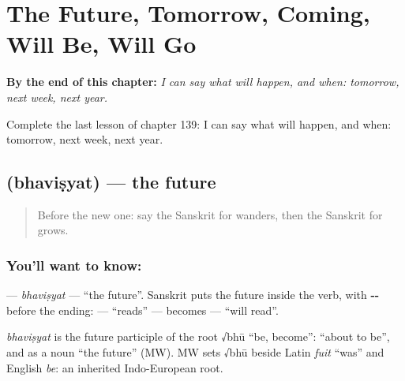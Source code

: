 
\chapter{The Future, Tomorrow, Coming, Will Be, Will Go}
\label{ch:sa-the-future-tomorrow-coming-will-be-will-go}

\begin{chapteropening}
\textbf{By the end of this chapter:} \emph{I can say what will happen, and when: tomorrow, next week, next year.}

Complete the last lesson of chapter 139: I can say what will happen, and when: tomorrow, next week, next year.
\end{chapteropening}

\section[\texorpdfstring{\sk{भविष्यत्} (bhaviṣyat)}{भविष्यत् (bhaviṣyat)}]{ (bhaviṣyat) — the future}

\label{lesson:SA-C139-bhavisyat}



\begin{quote}
Before the new one: say the Sanskrit for wanders, then the Sanskrit for grows.
\end{quote}

\subsection*{You'll want to know: }
\textbf{} — \emph{bhaviṣyat} — \textquotedblleft{}the future\textquotedblright{}. Sanskrit puts the future inside the verb, with \textbf{--} before the ending: \textbf{} — \textquotedblleft{}reads\textquotedblright{} — becomes \textbf{} — \textquotedblleft{}will read\textquotedblright{}.

\begin{cousinweb}
\emph{bhaviṣyat} is the future participle of the root √bhū \textquotedblleft{}be, become\textquotedblright{}: \textquotedblleft{}about to be\textquotedblright{}, and as a noun \textquotedblleft{}the future\textquotedblright{} (MW). MW sets √bhū beside Latin \emph{fuit} \textquotedblleft{}was\textquotedblright{} and English \emph{be}: an inherited Indo-European root.
\end{cousinweb}

